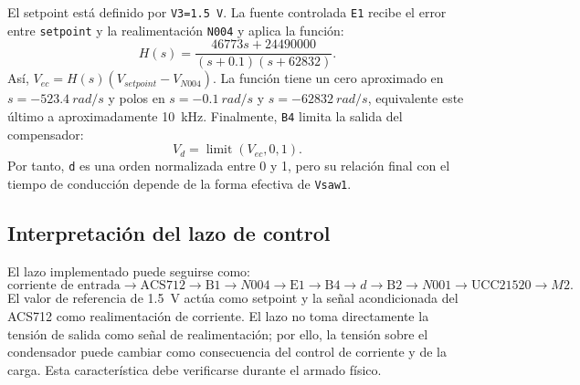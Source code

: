 \documentclass[12pt]{article}
\begin{document}
El setpoint está definido por \texttt{V3=1.5 V}. La fuente controlada \texttt{E1} recibe el error entre \texttt{setpoint} y la realimentación \texttt{N004} y aplica la función:
\begin{equation}
H(s)=\frac{46773s+24490000}{(s+0.1)(s+62832)}.
\label{eq:compensador}
\end{equation}
Así, $V_{ec}=H(s)(V_{setpoint}-V_{N004})$. La función tiene un cero aproximado en $s=-523.4\ \si{rad/s}$ y polos en $s=-0.1\ \si{rad/s}$ y $s=-62832\ \si{rad/s}$, equivalente este último a aproximadamente \SI{10}{kHz}. Finalmente, \texttt{B4} limita la salida del compensador:
\begin{equation}
V_d=\operatorname{limit}(V_{ec},0,1).
\label{eq:limitador}
\end{equation}
Por tanto, \texttt{d} es una orden normalizada entre 0 y 1, pero su relación final con el tiempo de conducción depende de la forma efectiva de \texttt{Vsaw1}.

\subsection{Interpretación del lazo de control}
El lazo implementado puede seguirse como:
\[
\text{corriente de entrada}\rightarrow\text{ACS712}\rightarrow\text{B1}\rightarrow N004
\rightarrow\text{E1}\rightarrow\text{B4}\rightarrow d
\rightarrow\text{B2}\rightarrow N001\rightarrow\text{UCC21520}\rightarrow M2.
\]
El valor de referencia de \SI{1.5}{V} actúa como setpoint y la señal acondicionada del ACS712 como realimentación de corriente. El lazo no toma directamente la tensión de salida como señal de realimentación; por ello, la tensión sobre el condensador puede cambiar como consecuencia del control de corriente y de la carga. Esta característica debe verificarse durante el armado físico.
\end{document}
